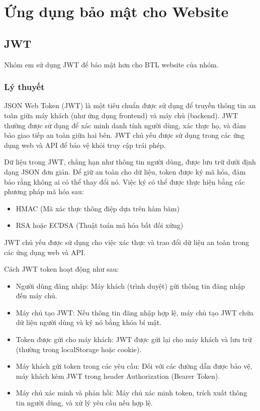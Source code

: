 \documentclass[../BTL.tex]{subfiles}
\begin{document}
\section{ Ứng dụng bảo mật cho Website}

\subsection{JWT}
Nhóm em sử dụng JWT để bảo mật hơn cho BTL website của nhóm. 
\subsubsection{ Lý thuyết}
JSON Web Token (JWT) là một tiêu chuẩn được sử dụng để truyền thông tin an toàn giữa máy khách (như ứng dụng frontend) và máy chủ (backend). JWT thường được sử dụng để xác minh danh tính người dùng, xác thực họ, và đảm bảo giao tiếp an toàn giữa hai bên. JWT chủ yếu được sử dụng trong các ứng dụng web và API để bảo vệ khỏi truy cập trái phép.\cite{jwt-gfg}

Dữ liệu trong JWT, chẳng hạn như thông tin người dùng, được lưu trữ dưới định dạng JSON đơn giản. Để giữ an toàn cho dữ liệu, token được ký mã hóa, đảm bảo rằng không ai có thể thay đổi nó. Việc ký có thể được thực hiện bằng các phương pháp mã hóa sau:

\begin{itemize}
    \item HMAC (Mã xác thực thông điệp dựa trên hàm băm)
    \item RSA hoặc ECDSA (Thuật toán mã hóa bất đối xứng)
\end{itemize}
JWT chủ yếu được sử dụng cho việc xác thực và trao đổi dữ liệu an toàn trong các ứng dụng web và API.

Cách JWT token hoạt động như sau:
\begin{itemize}
    \item Người dùng đăng nhập: Máy khách (trình duyệt) gửi thông tin đăng nhập đến máy chủ.
    \item Máy chủ tạo JWT: Nếu thông tin đăng nhập hợp lệ, máy chủ tạo JWT chứa dữ liệu người dùng và ký nó bằng khóa bí mật.
    \item Token được gửi cho máy khách: JWT được gửi lại cho máy khách và lưu trữ (thường trong localStorage hoặc cookie).
    \item Máy khách gửi token trong các yêu cầu: Đối với các đường dẫn được bảo vệ, máy khách kèm JWT trong header Authorization (Bearer Token).
    \item Máy chủ xác minh và phản hồi: Máy chủ xác minh token, trích xuất thông tin người dùng, và xử lý yêu cầu nếu hợp lệ.
\end{itemize}
\end{document}
